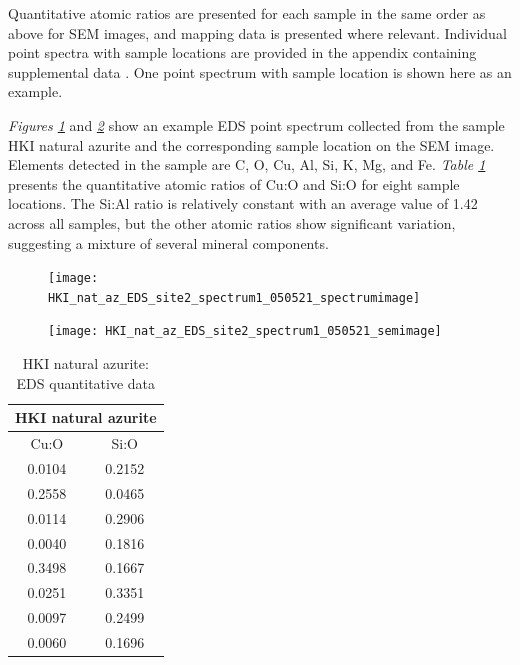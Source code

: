 Quantitative atomic ratios are presented for each sample in the same order as above for SEM images, and mapping data is presented where relevant. Individual point spectra with sample locations are provided in the appendix containing supplemental data . One point spectrum with sample location is shown here as an example.


\textit{Figures \ref{fig:hki_eds_spec}} and \textit{\ref{fig:hki_eds_semimage}} show an example EDS point spectrum collected from the sample HKI natural azurite and the corresponding sample location on the SEM image. Elements detected in the sample are C, O, Cu, Al, Si, K, Mg, and Fe. \textit{Table \ref{table:hki_ratios}} presents the quantitative atomic ratios of Cu:O and Si:O for eight sample locations. The Si:Al ratio is relatively constant with an average value of 1.42 across all samples, but the other atomic ratios show significant variation, suggesting a mixture of several mineral components.

\begin{figure}[H]
\centering
  \texttt{[image: HKI\_nat\_az\_EDS\_site2\_spectrum1\_050521\_spectrumimage]}
\label{fig:hki_eds_spec}
\end{figure}

\begin{figure}[H]
\centering
  \texttt{[image: HKI\_nat\_az\_EDS\_site2\_spectrum1\_050521\_semimage]}
\label{fig:hki_eds_semimage}
\end{figure}

\begin{table}[H]
\caption{HKI natural azurite: EDS quantitative data}
\centering
\label{table:hki_ratios}
\begin{tabular}{c c}
\toprule
\multicolumn{2}{c}{HKI natural azurite} \\
\midrule
Cu:O & Si:O \\
\midrule
0.0104 & 0.2152 \\
0.2558 & 0.0465 \\
0.0114 & 0.2906 \\
0.0040 & 0.1816 \\
0.3498 & 0.1667 \\
0.0251 & 0.3351  \\
0.0097 & 0.2499 \\
0.0060 & 0.1696 \\
\bottomrule
\end{tabular}
\end{table}

